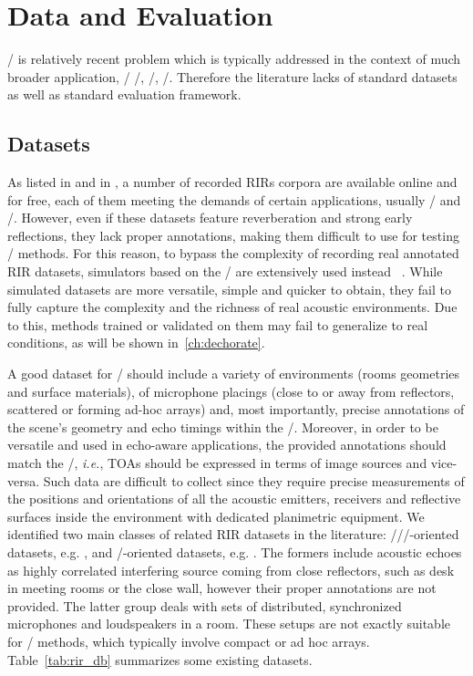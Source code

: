 \section{Data and Evaluation}\label{sec:estimation:datametrics}
\AER/ is relatively recent problem which is typically addressed in the context of much broader application, \eg/ \SE/, \RooGE/, \SSL/.
Therefore the literature lacks of standard datasets as well as standard evaluation framework.

\subsection{Datasets}
As listed in  and in , a number of recorded RIRs corpora are available online and for free, each of them meeting the demands of certain applications, usually \SE/ and \ASR/.
However, even if these datasets feature reverberation and strong early reflections, they lack proper annotations, making them difficult to use for testing \AER/ methods.
For this reason, to bypass the complexity of recording real annotated RIR datasets, simulators based on the \ISM/ are extensively used instead%
~\citeonly{}.
While simulated datasets are more versatile, simple and quicker to obtain, they fail to fully capture the complexity and the richness of real acoustic environments.
Due to this, methods trained or validated on them may fail to generalize to real conditions, as will be shown in~\cref{ch:dechorate}.

\mynewline
A good dataset for \AER/ should include a variety of environments (rooms geometries and surface materials), of microphone placings (close to or away from reflectors, scattered or forming ad-hoc arrays) and, most importantly, precise annotations of the scene's geometry and echo timings within the \RIRs/.
Moreover, in order to be versatile and used in echo-aware applications, the provided annotations should match the \ISM/, \textit{i.e.}, TOAs should be expressed in terms of image sources and vice-versa.
Such data are difficult to collect since they require precise measurements of the positions and orientations of all the acoustic emitters, receivers and reflective surfaces inside the environment with dedicated planimetric equipment.
We identified two main classes of related RIR datasets in the literature:
\SE//\ASR/-oriented datasets, e.g. , and \RooGE/-oriented datasets, e.g. .
The formers include acoustic echoes as highly correlated interfering source coming from close reflectors, such as desk in meeting rooms or the close wall, however their proper annotations are not provided.
The latter group deals with sets of distributed, synchronized microphones and loudspeakers in a room.
These setups are not exactly suitable for \SE/ methods, which typically involve compact or ad hoc arrays. Table~\ref{tab:rir_db} summarizes some existing datasets.

